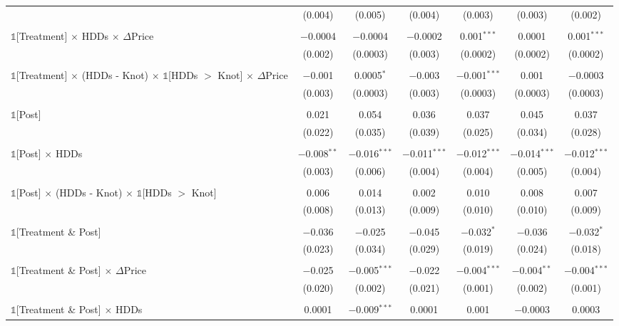 \begin{table}[!htbp]
\begin{longtable}{@{\extracolsep{15pt}}lcccccc}
  & (0.004) & (0.005) & (0.004) & (0.003) & (0.003) & (0.002) \\ 
  & & & & & & \\ 
 $\mathbb{1}$[Treatment] $\times$ HDDs $\times$ $\Delta$Price & $-$0.0004 & $-$0.0004 & $-$0.0002 & 0.001$^{***}$ & 0.0001 & 0.001$^{***}$ \\ 
  & (0.002) & (0.0003) & (0.003) & (0.0002) & (0.0002) & (0.0002) \\ 
  & & & & & & \\ 
 $\mathbb{1}$[Treatment] $\times$ (HDDs - Knot) $\times$ $\mathbb{1}$[HDDs $>$ Knot] $\times$ $\Delta$Price & $-$0.001 & 0.0005$^{*}$ & $-$0.003 & $-$0.001$^{***}$ & 0.001 & $-$0.0003 \\ 
  & (0.003) & (0.0003) & (0.003) & (0.0003) & (0.0003) & (0.0003) \\ 
  & & & & & & \\ 
 $\mathbb{1}$[Post] & 0.021 & 0.054 & 0.036 & 0.037 & 0.045 & 0.037 \\ 
  & (0.022) & (0.035) & (0.039) & (0.025) & (0.034) & (0.028) \\ 
  & & & & & & \\ 
 $\mathbb{1}$[Post] $\times$ HDDs & $-$0.008$^{**}$ & $-$0.016$^{***}$ & $-$0.011$^{***}$ & $-$0.012$^{***}$ & $-$0.014$^{***}$ & $-$0.012$^{***}$ \\ 
  & (0.003) & (0.006) & (0.004) & (0.004) & (0.005) & (0.004) \\ 
  & & & & & & \\ 
 $\mathbb{1}$[Post] $\times$ (HDDs - Knot) $\times$ $\mathbb{1}$[HDDs $>$ Knot] & 0.006 & 0.014 & 0.002 & 0.010 & 0.008 & 0.007 \\ 
  & (0.008) & (0.013) & (0.009) & (0.010) & (0.010) & (0.009) \\ 
  & & & & & & \\ 
 $\mathbb{1}$[Treatment \& Post] & $-$0.036 & $-$0.025 & $-$0.045 & $-$0.032$^{*}$ & $-$0.036 & $-$0.032$^{*}$ \\ 
  & (0.023) & (0.034) & (0.029) & (0.019) & (0.024) & (0.018) \\ 
  & & & & & & \\ 
 $\mathbb{1}$[Treatment \& Post] $\times$ $\Delta$Price & $-$0.025 & $-$0.005$^{***}$ & $-$0.022 & $-$0.004$^{***}$ & $-$0.004$^{**}$ & $-$0.004$^{***}$ \\ 
  & (0.020) & (0.002) & (0.021) & (0.001) & (0.002) & (0.001) \\ 
  & & & & & & \\ 
 $\mathbb{1}$[Treatment \& Post] $\times$ HDDs & 0.0001 & $-$0.009$^{***}$ & 0.0001 & 0.001 & $-$0.0003 & 0.0003 \\ 

\end{longtable}
\end{table}

